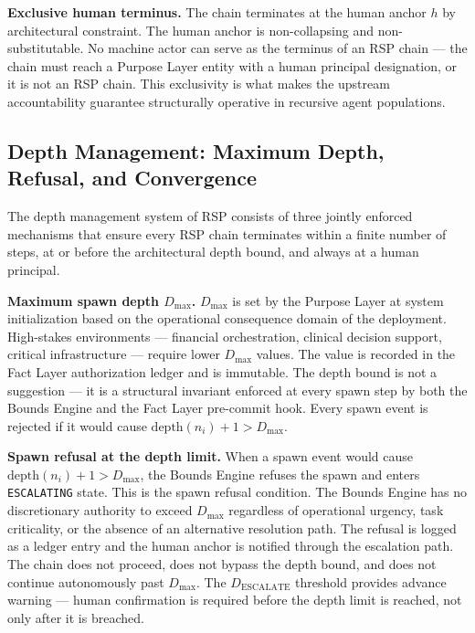 \medskip
\noindent\textbf{Exclusive human terminus.} The chain terminates at the human anchor $h$ by architectural constraint. The human anchor is non-collapsing and non-substitutable. No machine actor can serve as the terminus of an RSP chain — the chain must reach a Purpose Layer entity with a human principal designation, or it is not an RSP chain. This exclusivity is what makes the \bxthree{} upstream accountability guarantee structurally operative in recursive agent populations.

\subsection{Depth Management: Maximum Depth, Refusal, and Convergence}
\label{sec:rs-depth-management}

The depth management system of RSP consists of three jointly enforced mechanisms that ensure every RSP chain terminates within a finite number of steps, at or before the architectural depth bound, and always at a human principal.

\medskip
\noindent\textbf{Maximum spawn depth $D_{\max}$.} $D_{\max}$ is set by the Purpose Layer at system initialization based on the operational consequence domain of the deployment. High-stakes environments — financial orchestration, clinical decision support, critical infrastructure — require lower $D_{\max}$ values. The value is recorded in the Fact Layer authorization ledger and is immutable. The depth bound is not a suggestion — it is a structural invariant enforced at every spawn step by both the Bounds Engine and the Fact Layer pre-commit hook. Every spawn event is rejected if it would cause $\text{depth}(n_i) + 1 > D_{\max}$.

\medskip
\noindent\textbf{Spawn refusal at the depth limit.} When a spawn event would cause $\text{depth}(n_i) + 1 > D_{\max}$, the Bounds Engine refuses the spawn and enters \texttt{ESCALATING} state. This is the spawn refusal condition. The Bounds Engine has no discretionary authority to exceed $D_{\max}$ regardless of operational urgency, task criticality, or the absence of an alternative resolution path. The refusal is logged as a ledger entry and the human anchor is notified through the escalation path. The chain does not proceed, does not bypass the depth bound, and does not continue autonomously past $D_{\max}$. The $D_{\text{ESCALATE}}$ threshold provides advance warning — human confirmation is required before the depth limit is reached, not only after it is breached.

